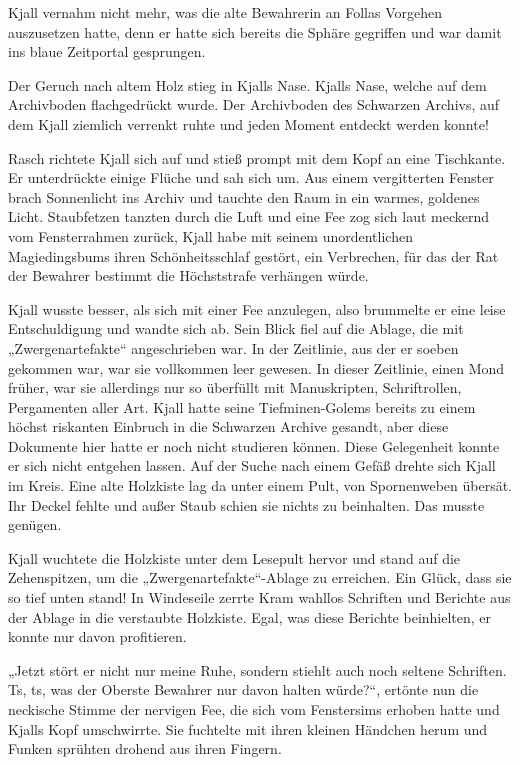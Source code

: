 Kjall vernahm nicht mehr, was die alte Bewahrerin an Follas Vorgehen auszusetzen hatte, denn er hatte sich bereits die Sphäre gegriffen und war damit ins blaue Zeitportal gesprungen.\bigskip



Der Geruch nach altem Holz stieg in Kjalls Nase. Kjalls Nase, welche auf dem Archivboden flachgedrückt wurde. Der Archivboden des Schwarzen Archivs, auf dem Kjall ziemlich verrenkt ruhte und jeden Moment entdeckt werden konnte!

Rasch richtete Kjall sich auf und stieß prompt mit dem Kopf an eine Tischkante. Er unterdrückte einige Flüche und sah sich um. Aus einem vergitterten Fenster brach Sonnenlicht ins Archiv und tauchte den Raum in ein warmes, goldenes Licht. Staubfetzen tanzten durch die Luft und eine Fee zog sich laut meckernd vom Fensterrahmen zurück, Kjall habe mit seinem unordentlichen Magiedingsbums ihren Schönheitsschlaf gestört, ein Verbrechen, für das der Rat der Bewahrer bestimmt die Höchststrafe verhängen würde.

Kjall wusste besser, als sich mit einer Fee anzulegen, also brummelte er eine leise Entschuldigung und wandte sich ab. Sein Blick fiel auf die Ablage, die mit „Zwergenartefakte“ angeschrieben war. In der Zeitlinie, aus der er soeben gekommen war, war sie vollkommen leer gewesen. In dieser Zeitlinie, einen Mond früher, war sie allerdings nur so überfüllt mit Manuskripten, Schriftrollen, Pergamenten aller Art. Kjall hatte seine Tiefminen-Golems bereits zu einem höchst riskanten Einbruch in die Schwarzen Archive gesandt, aber diese Dokumente hier hatte er noch nicht studieren können. Diese Gelegenheit konnte er sich nicht entgehen lassen. Auf der Suche nach einem Gefäß drehte sich Kjall im Kreis. Eine alte Holzkiste lag da unter einem Pult, von Spornenweben übersät. Ihr Deckel fehlte und außer Staub schien sie nichts zu beinhalten. Das musste genügen.

Kjall wuchtete die Holzkiste unter dem Lesepult hervor und stand auf die Zehenspitzen, um die „Zwergenartefakte“-Ablage zu erreichen. Ein Glück, dass sie so tief unten stand! In Windeseile zerrte Kram wahllos Schriften und Berichte aus der Ablage in die verstaubte Holzkiste. Egal, was diese Berichte beinhielten, er konnte nur davon profitieren.

„Jetzt stört er nicht nur meine Ruhe, sondern stiehlt auch noch seltene Schriften. Ts, ts, was der Oberste Bewahrer nur davon halten würde?“, ertönte nun die neckische Stimme der nervigen Fee, die sich vom Fenstersims erhoben hatte und Kjalls Kopf umschwirrte. Sie fuchtelte mit ihren kleinen Händchen herum und Funken sprühten drohend aus ihren Fingern.

